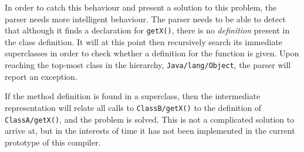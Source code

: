 In order to catch this behaviour and present a solution to this problem, the parser needs more intelligent behaviour. The parser needs to be able to detect that although it finds a declaration for \verb|getX()|, there is no \emph{definition} present in the class definition. It will at this point then recursively search its immediate superclasses in order to check whether a definition for the function is given. Upon reaching the top-most class in the hierarchy, \verb|Java/lang/Object|, the parser will report an exception.

If the method definition is found in a superclass, then the intermediate representation will relate all calls to \verb|ClassB/getX()| to the definition of \verb|ClassA/getX()|, and the problem is solved. This is not a complicated solution to arrive at, but in the interests of time it has not been implemented in the current prototype of this compiler.
